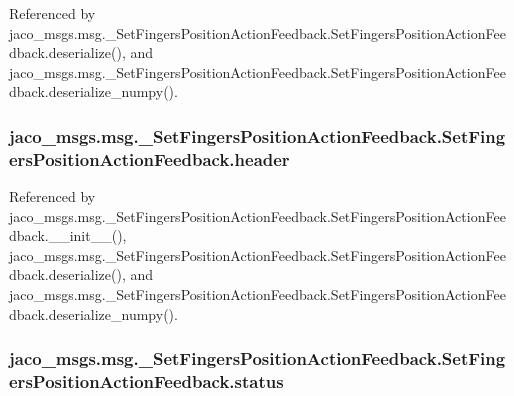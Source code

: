 Referenced by jaco\+\_\+msgs.\+msg.\+\_\+\+Set\+Fingers\+Position\+Action\+Feedback.\+Set\+Fingers\+Position\+Action\+Feedback.\+deserialize(), and jaco\+\_\+msgs.\+msg.\+\_\+\+Set\+Fingers\+Position\+Action\+Feedback.\+Set\+Fingers\+Position\+Action\+Feedback.\+deserialize\+\_\+numpy().

\subsubsection[{\texorpdfstring{header}{header}}]{\setlength{\rightskip}{0pt plus 5cm}jaco\+\_\+msgs.\+msg.\+\_\+\+Set\+Fingers\+Position\+Action\+Feedback.\+Set\+Fingers\+Position\+Action\+Feedback.\+header}\hypertarget{classjaco__msgs_1_1msg_1_1__SetFingersPositionActionFeedback_1_1SetFingersPositionActionFeedback_a5992a948362f03290d7fe28bcfc30eb1}{}\label{classjaco__msgs_1_1msg_1_1__SetFingersPositionActionFeedback_1_1SetFingersPositionActionFeedback_a5992a948362f03290d7fe28bcfc30eb1}


Referenced by jaco\+\_\+msgs.\+msg.\+\_\+\+Set\+Fingers\+Position\+Action\+Feedback.\+Set\+Fingers\+Position\+Action\+Feedback.\+\_\+\+\_\+init\+\_\+\+\_\+(), jaco\+\_\+msgs.\+msg.\+\_\+\+Set\+Fingers\+Position\+Action\+Feedback.\+Set\+Fingers\+Position\+Action\+Feedback.\+deserialize(), and jaco\+\_\+msgs.\+msg.\+\_\+\+Set\+Fingers\+Position\+Action\+Feedback.\+Set\+Fingers\+Position\+Action\+Feedback.\+deserialize\+\_\+numpy().

\subsubsection[{\texorpdfstring{status}{status}}]{\setlength{\rightskip}{0pt plus 5cm}jaco\+\_\+msgs.\+msg.\+\_\+\+Set\+Fingers\+Position\+Action\+Feedback.\+Set\+Fingers\+Position\+Action\+Feedback.\+status}\hypertarget{classjaco__msgs_1_1msg_1_1__SetFingersPositionActionFeedback_1_1SetFingersPositionActionFeedback_a714fac54f4393fce0f25761a151c9194}{}\label{classjaco__msgs_1_1msg_1_1__SetFingersPositionActionFeedback_1_1SetFingersPositionActionFeedback_a714fac54f4393fce0f25761a151c9194}


